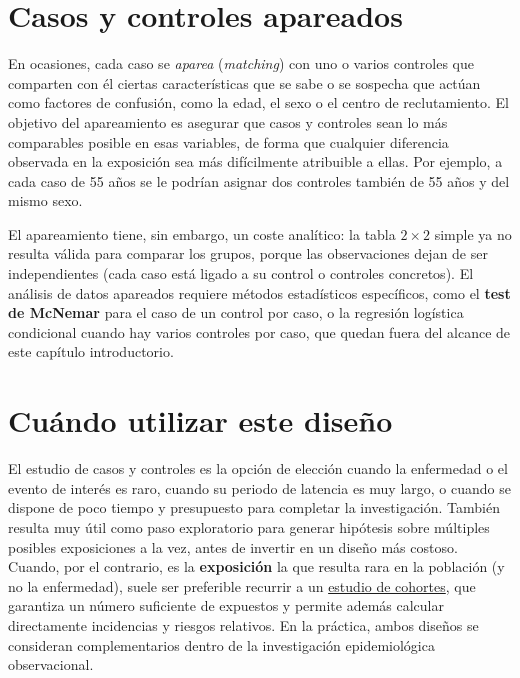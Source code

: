 \documentclass[
  spanish,
  a4paper,
]{scrreport}
\theoremstyle{definition}
\theoremstyle{definition}
\theoremstyle{remark}
\begin{document}
\section{Casos y controles apareados}\label{casos-y-controles-apareados}

En ocasiones, cada caso se \emph{aparea} (\emph{matching}) con uno o
varios controles que comparten con él ciertas características que se
sabe o se sospecha que actúan como factores de confusión, como la edad,
el sexo o el centro de reclutamiento. El objetivo del apareamiento es
asegurar que casos y controles sean lo más comparables posible en esas
variables, de forma que cualquier diferencia observada en la exposición
sea más difícilmente atribuible a ellas. Por ejemplo, a cada caso de 55
años se le podrían asignar dos controles también de 55 años y del mismo
sexo.

El apareamiento tiene, sin embargo, un coste analítico: la tabla
\(2\times 2\) simple ya no resulta válida para comparar los grupos,
porque las observaciones dejan de ser independientes (cada caso está
ligado a su control o controles concretos). El análisis de datos
apareados requiere métodos estadísticos específicos, como el
\textbf{test de McNemar} para el caso de un control por caso, o la
regresión logística condicional cuando hay varios controles por caso,
que quedan fuera del alcance de este capítulo introductorio.

\section{Cuándo utilizar este
diseño}\label{cuuxe1ndo-utilizar-este-diseuxf1o-3}

El estudio de casos y controles es la opción de elección cuando la
enfermedad o el evento de interés es raro, cuando su periodo de latencia
es muy largo, o cuando se dispone de poco tiempo y presupuesto para
completar la investigación. También resulta muy útil como paso
exploratorio para generar hipótesis sobre múltiples posibles
exposiciones a la vez, antes de invertir en un diseño más costoso.
Cuando, por el contrario, es la \textbf{exposición} la que resulta rara
en la población (y no la enfermedad), suele ser preferible recurrir a un
\hyperref[estudios-de-cohortes]{estudio de cohortes}, que garantiza un
número suficiente de expuestos y permite además calcular directamente
incidencias y riesgos relativos. En la práctica, ambos diseños se
consideran complementarios dentro de la investigación epidemiológica
observacional.
\end{document}
